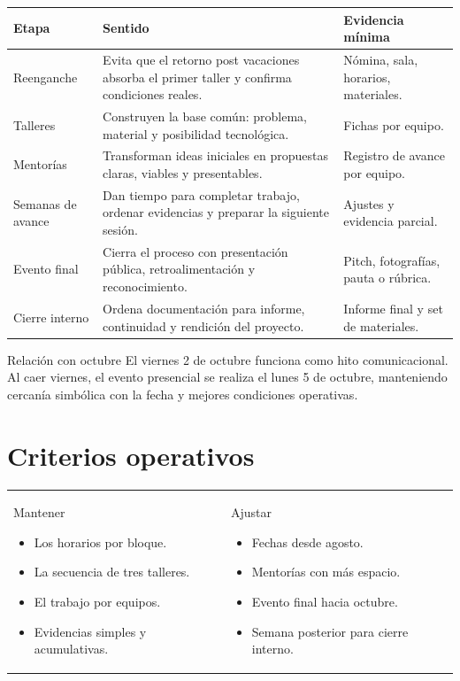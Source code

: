 \documentclass[10pt,a4paper]{article}
\begin{document}
\begin{tabularx}{\textwidth}{@{}L{32mm}Y L{38mm}@{}}
\textbf{\color{AIEPNavy}Etapa} & \textbf{\color{AIEPNavy}Sentido} & \textbf{\color{AIEPNavy}Evidencia mínima} \\
\hline
Reenganche & Evita que el retorno post vacaciones absorba el primer taller y confirma condiciones reales. & Nómina, sala, horarios, materiales. \\
Talleres & Construyen la base común: problema, material y posibilidad tecnológica. & Fichas por equipo. \\
Mentorías & Transforman ideas iniciales en propuestas claras, viables y presentables. & Registro de avance por equipo. \\
Semanas de avance & Dan tiempo para completar trabajo, ordenar evidencias y preparar la siguiente sesión. & Ajustes y evidencia parcial. \\
Evento final & Cierra el proceso con presentación pública, retroalimentación y reconocimiento. & Pitch, fotografías, pauta o rúbrica. \\
Cierre interno & Ordena documentación para informe, continuidad y rendición del proyecto. & Informe final y set de materiales. \\
\end{tabularx}

\vspace{5mm}
\begin{accentbox}{Relación con octubre}
El viernes 2 de octubre funciona como hito comunicacional. Al caer viernes, el evento presencial se realiza el lunes 5 de octubre, manteniendo cercanía simbólica con la fecha y mejores condiciones operativas.
\end{accentbox}

\section{Criterios operativos}

\begin{tabularx}{\textwidth}{@{}Y Y@{}}
\begin{docbox}[height=40mm]{Mantener}
\begin{itemize}
  \item Los horarios por bloque.
  \item La secuencia de tres talleres.
  \item El trabajo por equipos.
  \item Evidencias simples y acumulativas.
\end{itemize}
\end{docbox}
&
\begin{docbox}[height=40mm]{Ajustar}
\begin{itemize}
  \item Fechas desde agosto.
  \item Mentorías con más espacio.
  \item Evento final hacia octubre.
  \item Semana posterior para cierre interno.
\end{itemize}
\end{docbox}
\end{tabularx}
\end{document}
